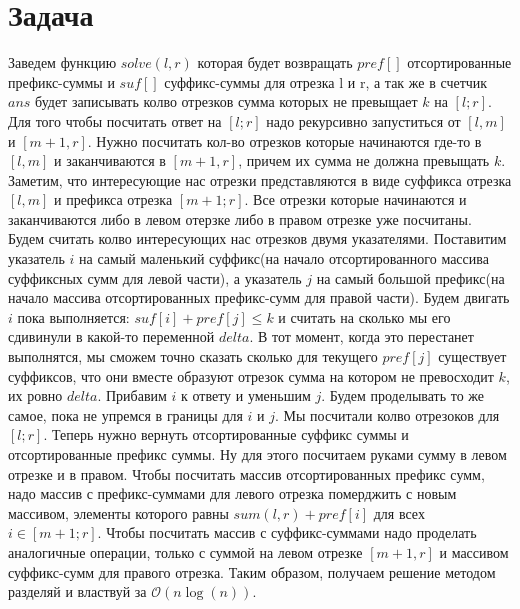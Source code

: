 \documentclass{article}
\begin{document}
\section*{Задача }
Заведем функцию $solve(l, r)$ которая будет возвращать $pref[]$ отсортированные префикс-суммы и $suf[]$ суффикс-суммы для отрезка l и r, а так же в счетчик $ans$ будет записывать колво отрезков сумма которых не превыщает $k$ на $[l;r]$. 
Для того чтобы посчитать ответ на $[l; r]$ надо рекурсивно запуститься от $[l, m]$ и $[m + 1, r]$. Нужно посчитать кол-во отрезков которые начинаются где-то в $[l, m]$ и заканчиваются в $[m + 1, r]$, причем их сумма не должна превыщать $k$.
\newline
Заметим, что интересующие нас отрезки представляются в виде суффикса отрезка $[l, m]$ и префикса отрезка $[m + 1; r]$. Все отрезки которые начинаются и заканчиваются либо в левом отерзке либо в правом отрезке уже посчитаны. 
\newline
Будем считать колво интересующих нас отрезков двумя указателями. Поставитим указатель $i$ на самый маленький суффикс(на начало отсортированного массива суффиксных сумм для левой части), а указатель $j$ на самый большой префикс(на начало массива отсортированных префикс-сумм для правой части).
\newline
Будем двигать $i$ пока выполняется: $suf[i] + pref[j] \leq k$  и считать на сколько мы его сдивинули в какой-то переменной $delta$. В тот момент, когда это перестанет выполнятся, мы сможем точно сказать сколько для текущего $pref[j]$ существует суффиксов, что они вместе образуют отрезок сумма на котором не превосходит $k$, их ровно $delta$. Прибавим $i$ к ответу и уменьшим $j$. Будем проделывать то же самое, пока не упремся в границы для $i$ и $j$. 
\newline
Мы посчитали колво отрезоков для $[l; r]$. Теперь нужно вернуть отсортированные суффикс суммы и отсортированные префикс суммы. Ну для этого посчитаем руками сумму в левом отрезке и в правом.
\newline
Чтобы посчитать массив отсортированных префикс сумм, надо массив с префикс-суммами для левого отрезка померджить с новым массивом, элементы которого равны $sum(l, r) + pref[i]$ для всех $i \in [m + 1;r]$. Чтобы посчитать массив с суффикс-суммами надо проделать аналогичные операции, только с суммой на левом отрезке $[m + 1, r]$ и массивом суффикс-сумм для правого отрезка.
\newline
Таким образом, получаем решение методом разделяй и властвуй за $\mathcal{O}(n\log(n))$.
\end{document}
